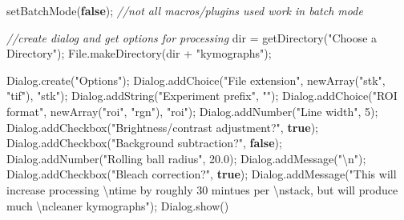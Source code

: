 \documentclass[
  12pt,
  a4paper,
]{book}
\newenvironment{Shaded}{}{}
\newcommand{\CommentTok}[1]{\textcolor[rgb]{0.38,0.63,0.69}{\textit{#1}}}
\newcommand{\DecValTok}[1]{\textcolor[rgb]{0.25,0.63,0.44}{#1}}
\newcommand{\FloatTok}[1]{\textcolor[rgb]{0.25,0.63,0.44}{#1}}
\newcommand{\KeywordTok}[1]{\textcolor[rgb]{0.00,0.44,0.13}{\textbf{#1}}}
\newcommand{\NormalTok}[1]{#1}
\newcommand{\OperatorTok}[1]{\textcolor[rgb]{0.40,0.40,0.40}{#1}}
\newcommand{\SpecialCharTok}[1]{\textcolor[rgb]{0.25,0.44,0.63}{#1}}
\newcommand{\StringTok}[1]{\textcolor[rgb]{0.25,0.44,0.63}{#1}}
\begin{document}
\begin{Shaded}
\begin{Highlighting}[]
\NormalTok{setBatchMode}\OperatorTok{(}\KeywordTok{false}\OperatorTok{);}
\CommentTok{//not all macros/plugins used work in batch mode}

\CommentTok{//create dialog and get options for processing}
\NormalTok{dir }\OperatorTok{=}\NormalTok{ getDirectory}\OperatorTok{(}\StringTok{"Choose a Directory"}\OperatorTok{);}
\NormalTok{File}\OperatorTok{.}\NormalTok{makeDirectory}\OperatorTok{(}\NormalTok{dir }\OperatorTok{+} \StringTok{"kymographs"}\OperatorTok{);}

\NormalTok{Dialog}\OperatorTok{.}\NormalTok{create}\OperatorTok{(}\StringTok{"Options"}\OperatorTok{);}
\NormalTok{Dialog}\OperatorTok{.}\NormalTok{addChoice}\OperatorTok{(}\StringTok{"File extension"}\OperatorTok{,}\NormalTok{ newArray}\OperatorTok{(}\StringTok{"stk"}\OperatorTok{,} \StringTok{"tif"}\OperatorTok{),} \StringTok{"stk"}\OperatorTok{);}
\NormalTok{Dialog}\OperatorTok{.}\NormalTok{addString}\OperatorTok{(}\StringTok{"Experiment prefix"}\OperatorTok{,} \StringTok{""}\OperatorTok{);}
\NormalTok{Dialog}\OperatorTok{.}\NormalTok{addChoice}\OperatorTok{(}\StringTok{"ROI format"}\OperatorTok{,}\NormalTok{ newArray}\OperatorTok{(}\StringTok{"roi"}\OperatorTok{,} \StringTok{"rgn"}\OperatorTok{),} \StringTok{"roi"}\OperatorTok{);}
\NormalTok{Dialog}\OperatorTok{.}\NormalTok{addNumber}\OperatorTok{(}\StringTok{"Line width"}\OperatorTok{,} \DecValTok{5}\OperatorTok{);}
\NormalTok{Dialog}\OperatorTok{.}\NormalTok{addCheckbox}\OperatorTok{(}\StringTok{"Brightness/contrast adjustment?"}\OperatorTok{,} \KeywordTok{true}\OperatorTok{);}
\NormalTok{Dialog}\OperatorTok{.}\NormalTok{addCheckbox}\OperatorTok{(}\StringTok{"Background subtraction?"}\OperatorTok{,} \KeywordTok{false}\OperatorTok{);}
\NormalTok{Dialog}\OperatorTok{.}\NormalTok{addNumber}\OperatorTok{(}\StringTok{"Rolling ball radius"}\OperatorTok{,} \FloatTok{20.0}\OperatorTok{);}
\NormalTok{Dialog}\OperatorTok{.}\NormalTok{addMessage}\OperatorTok{(}\StringTok{"}\SpecialCharTok{\textbackslash{}n}\StringTok{"}\OperatorTok{);}
\NormalTok{Dialog}\OperatorTok{.}\NormalTok{addCheckbox}\OperatorTok{(}\StringTok{"Bleach correction?"}\OperatorTok{,} \KeywordTok{true}\OperatorTok{);}
\NormalTok{Dialog}\OperatorTok{.}\NormalTok{addMessage}\OperatorTok{(}\StringTok{"This will increase processing }\SpecialCharTok{\textbackslash{}n}\StringTok{time by roughly 30 mintues per }\SpecialCharTok{\textbackslash{}n}\StringTok{stack, but will produce much }\SpecialCharTok{\textbackslash{}n}\StringTok{cleaner kymographs"}\OperatorTok{);}
\NormalTok{Dialog}\OperatorTok{.}\NormalTok{show}\OperatorTok{()}


\end{Highlighting}
\end{Shaded}
\end{document}
